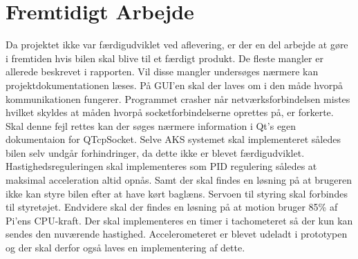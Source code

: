 \chapter{Fremtidigt Arbejde} \label{ch:Fremtidigt_arbejde}

Da projektet ikke var færdigudviklet ved aflevering, er der en del arbejde at gøre i fremtiden hvis bilen skal blive til et færdigt produkt. 
De fleste mangler er allerede beskrevet i rapporten. Vil disse mangler undersøges nærmere kan projektdokumentationen læses. 
På GUI'en skal der laves om i den måde hvorpå kommunikationen fungerer. 
Programmet crasher når netværksforbindelsen mistes hvilket skyldes at måden hvorpå socketforbindelserne oprettes på, er forkerte. 
Skal denne fejl rettes kan der søges nærmere information i Qt's egen dokumentaion for QTcpSocket\cite{lib:qtcpsocket}. 
Selve AKS systemet skal implementeret således bilen selv undgår forhindringer, da dette ikke er blevet færdigudviklet.
Hastighedsreguleringen skal implementeres som PID regulering således at maksimal acceleration altid opnås. 
Samt der skal findes en løsning på at brugeren ikke kan styre bilen efter at have kørt baglæns. 
Servoen til styring skal forbindes til styretøjet.
Endvidere skal der findes en løsning på at motion bruger 85\% af Pi'ens CPU-kraft. 
Der skal implementeres en timer i tachometeret så der kun kan sendes den nuværende hastighed. 
Accelerometeret er blevet udeladt i prototypen og der skal derfor også laves en implementering af dette.